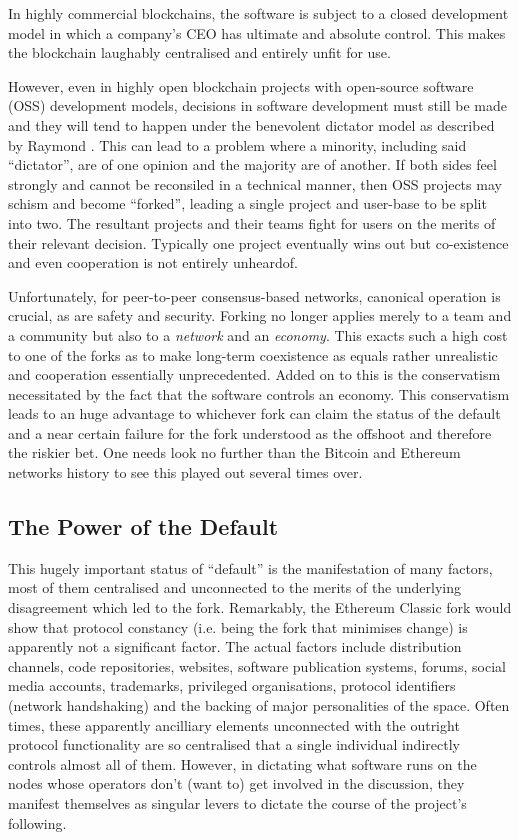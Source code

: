 \documentclass[9pt,oneside]{amsart}
\makeatletter
\newcommand*\ie{i.e.\@\xspace}
\makeatother
\begin{document}
In highly commercial blockchains, the software is subject to a closed development model in which a company's CEO has ultimate and absolute control. This makes the blockchain laughably centralised and entirely unfit for use.

However, even in highly open blockchain projects with open-source software (OSS) development models, decisions in software development must still be made and they will tend to happen under the benevolent dictator model as described by Raymond \cite{raymond1999cathedral}. This can lead to a problem where a minority, including said ``dictator'', are of one opinion and the majority are of another. If both sides feel strongly and cannot be reconsiled in a technical manner, then OSS projects may schism and become ``forked'', leading a single project and user-base to be split into two. The resultant projects and their teams fight for users on the merits of their relevant decision. Typically one project eventually wins out but co-existence and even cooperation is not entirely unheardof.

Unfortunately, for peer-to-peer consensus-based networks, canonical operation is crucial, as are safety and security. Forking no longer applies merely to a team and a community but also to a \emph{network} and an \emph{economy}. This exacts such a high cost to one of the forks as to make long-term coexistence as equals rather unrealistic and cooperation essentially unprecedented. Added on to this is the conservatism necessitated by the fact that the software controls an economy. This conservatism leads to an huge advantage to whichever fork can claim the status of the default and a near certain failure for the fork understood as the offshoot and therefore the riskier bet. One needs look no further than the Bitcoin and Ethereum networks history to see this played out several times over.

\subsection{The Power of the Default}

This hugely important status of ``default'' is the manifestation of many factors, most of them centralised and unconnected to the merits of the underlying disagreement which led to the fork. Remarkably, the Ethereum Classic fork would show that protocol constancy (\ie being the fork that minimises change) is apparently not a significant factor. The actual factors include distribution channels, code repositories, websites, software publication systems, forums, social media accounts, trademarks, privileged organisations, protocol identifiers (network handshaking) and the backing of major personalities of the space. Often times, these apparently ancilliary elements unconnected with the outright protocol functionality are so centralised that a single individual indirectly controls almost all of them. However, in dictating what software runs on the nodes whose operators don't (want to) get involved in the discussion, they manifest themselves as singular levers to dictate the course of the project's following.
\end{document}
